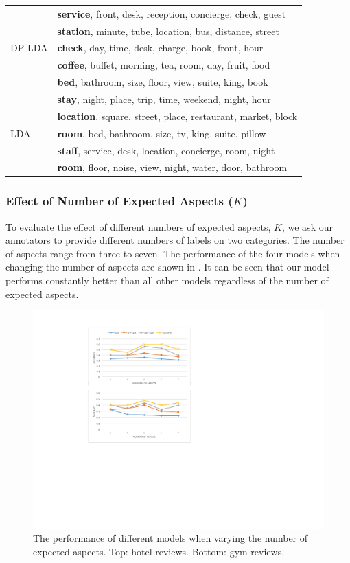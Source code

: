 \begin{table}[th]
\begin{tabular}{|l|l|}
\multirow{5}{*}{DP-LDA}
& \textbf{service}, front, desk, reception, concierge, check, guest \\
& \textbf{station}, minute, tube, location, bus, distance, street \\
& \textbf{check}, day, time, desk, charge, book, front, hour \\
& \textbf{coffee}, buffet, morning, tea, room, day, fruit, food \\
& \textbf{bed}, bathroom, size, floor, view, suite, king, book \\\hline

\multirow{5}{*}{LDA}
& \textbf{stay}, night, place, trip, time, weekend, night, hour \\
& \textbf{location}, square, street, place, restaurant, market, block \\
& \textbf{room}, bed, bathroom, size, tv, king, suite, pillow \\
& \textbf{staff}, service, desk, location, concierge, room, night \\
& \textbf{room}, floor, noise, view, night, water, door, bathroom \\\hline
\end{tabular}
\end{table}


\subsubsection{Effect of Number of Expected Aspects ($K$)}

To evaluate the effect of different numbers of expected aspects, $K$, 
we ask our annotators to provide different numbers of labels on two categories. 
The number of aspects range from three to seven. 
The performance of the four models when changing the number of aspects are 
shown in . 
It can be seen that our model performs constantly better than all other 
models regardless of the number of expected aspects. 

\begin{figure}[t!]
\centering
\includegraphics[width=0.9\columnwidth]{figures/differentk}
\caption{The performance of different models when varying the number of 
expected aspects. Top: hotel reviews. Bottom: gym reviews.}
\label{fig:differentk}
\end{figure}



